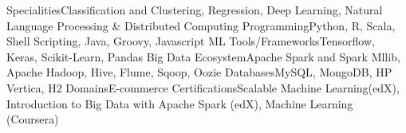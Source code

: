 \begin{cvskills}
\cvskill
{Specialities}{Classification and Clustering, Regression, Deep Learning, Natural Language Processing \& Distributed Computing}
\cvskill
{Programming}{Python, R, Scala, Shell Scripting, Java, Groovy, Javascript}
\cvskill
{ML Tools/Frameworks}{Tensorflow, Keras, Scikit-Learn, Pandas}
\cvskill
{Big Data Ecosystem}{Apache Spark and Spark Mllib, Apache Hadoop, Hive, Flume, Sqoop, Oozie}
\cvskill
{Databases}{MySQL, MongoDB, HP Vertica, H2}
\cvskill
{Domains}{E-commerce}
\cvskill
{Certifications}{Scalable Machine Learning(edX), Introduction to Big Data with Apache Spark (edX), Machine Learning (Coursera)}
\end{cvskills}
